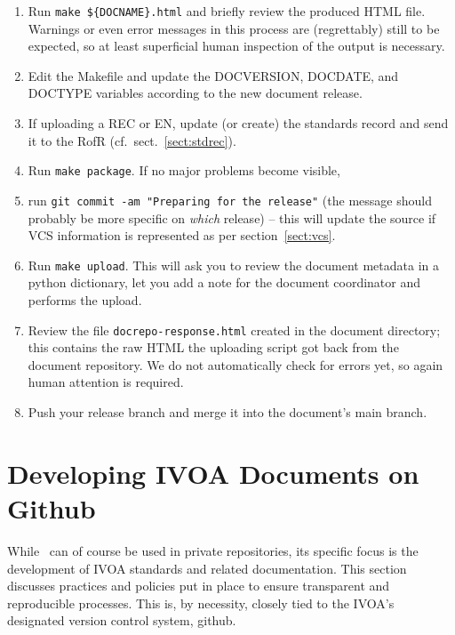 \documentclass[11pt,a4paper]{ivoa}
\begin{document}
\begin{enumerate}
\item Run \verb|make ${DOCNAME}.html| and briefly review the produced
HTML file.  Warnings or even error messages in this process are
(regrettably) still to be expected, so at least superficial human inspection
of the output is necessary.

\item Edit the Makefile and update the DOCVERSION, DOCDATE, and DOCTYPE
variables according to the new document release.

\item If uploading a REC or EN, update (or create) the standards record
and send it to the RofR (cf.~sect.~\ref{sect:stdrec}).

\item Run \verb|make package|.  If no major problems become visible,

\item run \verb|git commit -am "Preparing for the release"| (the message
should probably be more specific on \textit{which} release) -- this
will update the source if VCS information is represented as per
section~\ref{sect:vcs}.

\item Run \verb|make upload|.  This will ask you to review the document
metadata in a python dictionary, let you add a note for the document
coordinator and performs the upload.

\item Review the file \texttt{docrepo-response.html} created in the
document directory; this contains the raw HTML the uploading script got
back from the document repository.  We do not automatically check for
errors yet, so again human attention is required.

\item Push your release branch and merge it into the document's main
branch.

\end{enumerate}


\section{Developing IVOA Documents on Github}
\label{sect:ivoapol}

While \ivoatex\ can of course be used in private repositories, its
specific focus is the development of IVOA standards and related
documentation.  This section discusses practices and policies put in
place to ensure transparent and reproducible processes.  This is, by
necessity, closely tied to the IVOA's designated version control system,
github.
\end{document}

